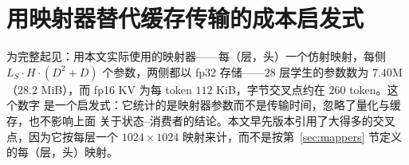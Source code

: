 \documentclass[11pt]{article}
\begin{document}
\section{用映射器替代缓存传输的成本启发式}
\label{app:cost}
为完整起见：用本文实际使用的映射器——每（层，头）一个仿射映射，每侧
$L_S\cdot H\cdot(D^2+D)$ 个参数，两侧都以 fp32 存储——$28$ 层学生的参数数为 $7.40$M
（$28.2$ MiB），而 fp16 KV 为每 token $112$ KiB，字节交叉点约在 $260$ token。这个数字
是一个启发式：它统计的是映射器参数而不是传输时间，忽略了量化与缓存，也不影响上面
关于状态--消费者的结论。本文早先版本引用了大得多的交叉点，因为它按每层一个
$1024\times1024$ 映射来计，而不是按第~\ref{sec:mappers} 节定义的每（层，头）映射。
\end{document}
